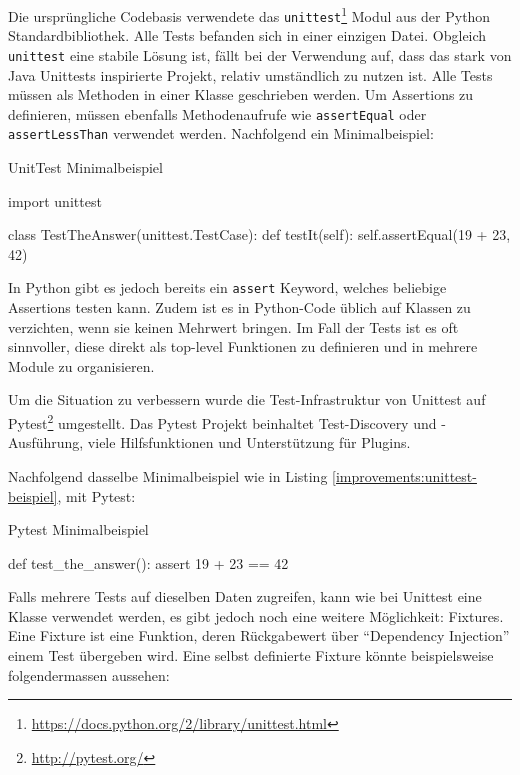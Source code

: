 Die ursprüngliche Codebasis verwendete das
\texttt{unittest}\footnote{\url{https://docs.python.org/2/library/unittest.html}}
Modul aus der Python Standardbibliothek. Alle Tests befanden sich in einer
einzigen Datei.  Obgleich \texttt{unittest} eine stabile Lösung ist, fällt bei
der Verwendung auf, dass das stark von Java Unittests inspirierte Projekt,
relativ umständlich zu nutzen ist. Alle Tests müssen als Methoden in einer
Klasse geschrieben werden. Um Assertions zu definieren, müssen ebenfalls
Methodenaufrufe wie \texttt{assertEqual} oder \texttt{assertLessThan} verwendet
werden. Nachfolgend ein Minimalbeispiel:

\begin{listing}
\caption{UnitTest Minimalbeispiel}
\label{improvements:unittest-beispiel}
\begin{pythoncode}
import unittest

class TestTheAnswer(unittest.TestCase):
    def testIt(self):
        self.assertEqual(19 + 23, 42)
\end{pythoncode}
\end{listing}

In Python gibt es jedoch bereits ein \texttt{assert} Keyword, welches beliebige
Assertions testen kann. Zudem ist es in Python-Code üblich auf Klassen zu
verzichten, wenn sie keinen Mehrwert bringen. Im Fall der Tests ist es oft
sinnvoller, diese direkt als top-level Funktionen zu definieren und in mehrere
Module zu organisieren.

Um die Situation zu verbessern wurde die Test-Infrastruktur von
Unittest auf Pytest\footnote{\url{http://pytest.org/}} umgestellt. Das
Pytest Projekt beinhaltet Test-Discovery und -Ausführung, viele Hilfsfunktionen
und Unterstützung für Plugins.

Nachfolgend dasselbe Minimalbeispiel wie in Listing
\ref{improvements:unittest-beispiel}, mit Pytest:

\begin{listing}
\caption{Pytest Minimalbeispiel}
\label{improvements:pytest-beispiel}
\begin{pythoncode}
def test_the_answer():
    assert 19 + 23 == 42
\end{pythoncode}
\end{listing}

Falls mehrere Tests auf dieselben Daten zugreifen, kann wie bei Unittest eine
Klasse verwendet werden, es gibt jedoch noch eine weitere Möglichkeit: Fixtures.
Eine Fixture ist eine Funktion, deren Rückgabewert über \enquote{Dependency
Injection} einem Test übergeben wird. Eine selbst definierte Fixture könnte
beispielsweise folgendermassen aussehen:

